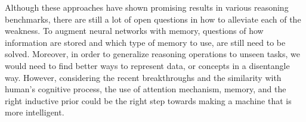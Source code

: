 \documentclass[journal]{IEEEtran}
\begin{document}
Although these approaches have shown promising results in various reasoning benchmarks, 
there are still a lot of open questions in how to alleviate each of the weakness. 
To augment neural networks with memory, questions of how information are stored 
and which type of memory to use, are still need to be solved. 
Moreover, in order to generalize reasoning operations to unseen tasks, 
we would need to find better ways to represent data, or concepts in a disentangle way.
However, considering the recent breakthroughs and the similarity with human's cognitive process, 
the use of attention mechanism, memory, and the right inductive prior could be the right step towards making a machine that is more intelligent.



\end{document}
